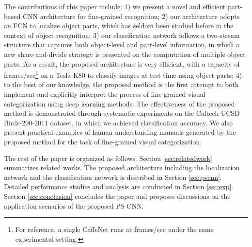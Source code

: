 \documentclass[10pt,twocolumn,letterpaper]{article}
\begin{document}
The contributions of this paper include: 1) we present a novel and efficient part-based CNN architecture for fine-grained recognition; 2) our architecture adopts an FCN to localize object parts, which has seldom been studied before in the context of object recognition; 3) our classification network follows a two-stream structure that captures both object-level and part-level information, in which a new share-and-divide strategy is presented on the computation of multiple object parts. As a result, the proposed architecture is very efficient, with a capacity of  frames/sec\footnote{For reference, a single CaffeNet runs at  frames/sec under the same experimental setting.} on a Tesla K80 to classify images at test time using  object parts; 4) to the best of our knowledge, the proposed method is the first attempt to both implement and explicitly interpret the process of fine-grained visual categorization using deep learning methods.
The effectiveness of the proposed method is demonstrated through systematic experiments on the Caltech-UCSD Birds-200-2011 \cite{wah2011caltech} dataset, in which we achieved  classification accuracy. We also present practical examples of human-understanding manuals generated by the proposed method for the task of fine-grained visual categorization.






The rest of the paper is organized as follows. Section \ref{sec:relatedwork} summarizes related works. The proposed architecture including the localization network and the classification network is described in Section \ref{sec:pscnn}.
Detailed performance studies and analysis are conducted in Section \ref{sec:exp}. Section \ref{sec:conclusion} concludes the paper and proposes discussions on the application scenarios of the proposed PS-CNN.
\end{document}
